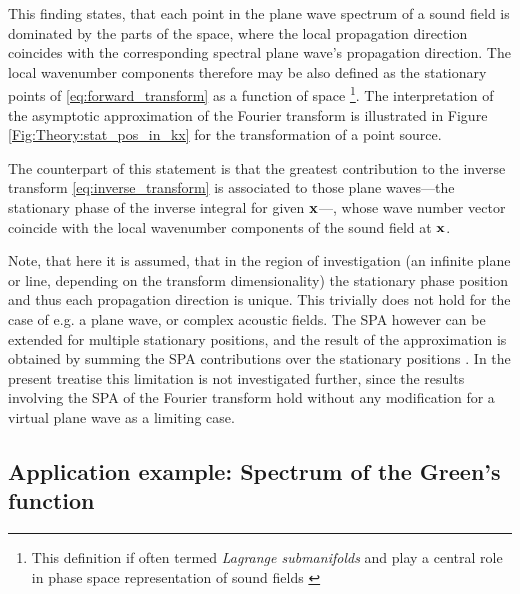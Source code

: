 This finding states, that each point in the plane wave spectrum of a sound field is dominated by the parts of the space, where the local propagation direction coincides with the corresponding spectral plane wave's propagation direction.
The local wavenumber components therefore may be also defined as the stationary points of \eqref{eq:forward_transform} as a function of space \footnote{This definition if often termed \emph{Lagrange submanifolds} and play a central role in phase space representation of sound fields \cite{Arnold1995, Tinkelman2005, Steinberg1993}}.
The interpretation of the asymptotic approximation of the Fourier transform is illustrated in Figure \ref{Fig:Theory:stat_pos_in_kx} for the transformation of a point source.

The counterpart of this statement is that the greatest contribution to the inverse transform \eqref{eq:inverse_transform} is associated to those plane waves---the stationary phase of the inverse integral for given $\mathbf{x}$---, whose wave number vector coincide with the local wavenumber components of the sound field at $\mathbf{x}$.

Note, that here it is assumed, that in the region of investigation (an infinite plane or line, depending on the transform dimensionality) the stationary phase position and thus each propagation direction is unique.
This trivially does not hold for the case of e.g. a plane wave, or complex acoustic fields.
The SPA however can be extended for multiple stationary positions, and the result of the approximation is obtained by summing the SPA contributions over the stationary positions \cite[p. 129]{Bleistein2000}.
In the present treatise this limitation is not investigated further, since the results involving the SPA of the Fourier transform hold without any modification for a virtual plane wave as a limiting case. 	

\subsection*{Application example: Spectrum of the Green's function}
\label{sec:greens_function_pectrum}

